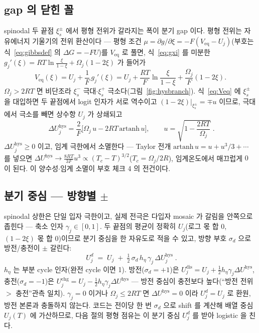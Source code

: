 \documentclass[11pt,a4paper]{article}
\newcommand{\eq}{\mathrm{eq}}
\newcommand{\hys}{\mathrm{hys}}
\newcommand{\dis}{\mathrm{dis}}
\newcommand{\chg}{\mathrm{chg}}
\newcommand{\sgn}{\sigma_d}
\begin{document}
\subsection{gap 의 닫힌 꼴}
spinodal 두 끝점 $\xi_s^\pm$ 에서 평형 전위가 갈라지는 폭이 분기 gap 이다. 평형 전위는 자유에너지 기울기의 전위 환산이다 — 평형 조건 $\mu=\partial g/\partial\xi=-F(V_\eq-U_j)$(부호는 식~\eqref{eq:gibbsdef} 의 $\Delta G=-FU$)를 $V_\eq$ 로 풀면, 식~\eqref{eq:gxi} 를 미분한 $g_j'(\xi)=RT\ln\tfrac{\xi}{1-\xi}+\Omega_j(1-2\xi)$ 가 들어가
\begin{equation}
V_\eq(\xi)=U_j+\frac{1}{F}\,g_j'(\xi)=U_j+\frac{RT}{F}\ln\frac{\xi}{1-\xi}+\frac{\Omega_j}{F}(1-2\xi).
\label{eq:Veq}
\end{equation}
$\Omega_j>2RT$ 면 비단조라 $\xi_s^-$ 극대$\cdot$$\xi_s^+$ 극소다(그림~\ref{fig:hysbranch}). 식~\eqref{eq:Veq} 에 $\xi_s^\pm$ 을 대입하면 두 끝점에서 logit 인자가 서로 역수이고 $(1-2\xi)|_{\xi_s^\pm}=\mp u$ 이므로, 극대에서 극소를 빼면 상수항 $U_j$ 가 상쇄되고
\begin{equation}
\boxed{\;\Delta U_j^\hys=\frac{2}{F}\Big[\Omega_j\,u-2RT\,\mathrm{artanh}\,u\Big],\qquad
u=\sqrt{1-\frac{2RT}{\Omega_j}}\;.}
\label{eq:dUhys}
\end{equation}
$\Delta U_j^\hys\ge0$ 이고, 임계 극한에서 소멸한다 — Taylor 전개 $\mathrm{artanh}\,u=u+u^3/3+\cdots$ 를 넣으면 $\Delta U^\hys\to\tfrac{8RT}{3F}u^3\propto(T_c-T)^{3/2}$($T_c=\Omega_j/2R$), 임계온도에서 매끄럽게 $0$ 이 된다. 이 양수성$\cdot$임계 소멸이 부호 체크 4 의 전건이다.

\subsection{분기 중심 — 방향별 $\pm$}
spinodal 상한은 단일 입자 극한이고, 실제 전극은 다입자 mosaic 가 갈림을 안쪽으로 좁힌다 — 축소 인자 $\gamma_j\in[0,1]$. 두 끝점의 평균이 정확히 $U_j$(로그 몫 합 $0$, $(1-2\xi)$ 몫 합 $0$)이므로 분기 중심을 한 자유도로 적을 수 있고, 방향 부호 $\sgn$ 으로 방전/충전이 $\pm$ 갈린다:
\begin{equation}
\boxed{\;U_j^d\;=\;U_j\;+\;\tfrac12\,\sgn\,h_\eta\,\gamma_j\,\Delta U_j^\hys\;.}
\label{eq:Ubranch}
\end{equation}
$h_\eta$ 는 부분 cycle 인자(완전 cycle 이면 1). 방전($\sgn=+1$)은 $U_j^\dis=U_j+\tfrac12 h_\eta\gamma_j\Delta U^\hys$, 충전($\sgn=-1$)은 $U_j^\chg=U_j-\tfrac12 h_\eta\gamma_j\Delta U^\hys$ — 방전 중심이 충전보다 높다(``방전 전위 $>$ 충전''관측 일치). $\gamma_j=0$ 이거나 $\Omega_j\le2RT$ 면 $\Delta U^\hys=0$ 이라 $U_j^d=U_j$ 로 환원, 방전 본론과 충돌하지 않는다. 코드는 전이당 한 번 $\sgn$ 으로 shift 를 계산해 배열 중심 $U_j(T)$ 에 가산하므로, 다음 절의 평형 점유는 이 분기 중심 $U_j^d$ 를 받아 logistic 을 친다.
\end{document}
